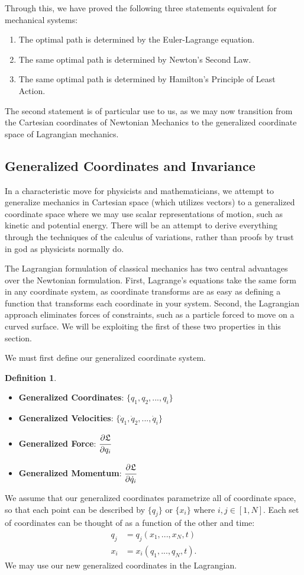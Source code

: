 \documentclass[10.5pt, psamsfonts]{amsart}
\theoremstyle{definition}
\newtheorem{defn}[thm]{Definition}
\theoremstyle{remark}
\numberwithin{equation}{section}
\begin{document}
Through this, we have proved the following three statements equivalent for mechanical systems:
\begin{enumerate}
\item The optimal path is determined by the Euler-Lagrange equation.
\item The same optimal path is determined by Newton's Second Law.
\item The same optimal path is determined by Hamilton's Principle of Least Action.
\end{enumerate}
The second statement is of particular use to us, as we may now transition from the Cartesian coordinates of Newtonian Mechanics to the generalized coordinate space of Lagrangian mechanics.

\subsection{Generalized Coordinates and Invariance}
In a characteristic move for physicists and mathematicians, we attempt to generalize mechanics in Cartesian space (which utilizes vectors) to a generalized coordinate space where we may use scalar representations of motion, such as kinetic and potential energy. 
There will be an attempt to derive everything through the techniques of the calculus of variations, rather than proofs by trust in god as physicists normally do.

The Lagrangian formulation of classical mechanics has two central advantages over the Newtonian formulation. First, Lagrange's equations take the same form in any coordinate system, as coordinate transforms are as easy as defining a function that transforms each coordinate in your system. Second, the Lagrangian approach eliminates forces of constraints, such as a particle forced to move on a curved surface. We will be exploiting the first of these two properties in this section.

We must first define our generalized coordinate system.
\begin{defn}
\;
\begin{itemize}
\item[] \textbf{Generalized Coordinates}: $\{q_1, q_2, ..., q_i\}$
\item[] \textbf{Generalized Velocities}: $\{\dot{q}_1, \dot{q}_2, ..., \dot{q}_i\}$
\item[] \textbf{Generalized Force}: $\cfrac{\partial \mathfrak{L}}{\partial q_i} $
\item[] \textbf{Generalized Momentum}: $\cfrac{\partial \mathfrak{L}}{\partial \dot{q}_i}$
\end{itemize}
\end{defn}
\noindent We assume that our generalized coordinates parametrize all of coordinate space, so that each point can be described by $\{q_j\}$ or $\{x_i\}$ where $i, j \in [1, N]$. Each set of coordinates can be thought of as a function of the other and time:
\begin{align*}
  q_j &= q_j(x_1,...,x_N, t)\\
  x_i &= x_i(q_1,...,q_N, t).
\end{align*}
We may use our new generalized coordinates in the Lagrangian.
\end{document}
